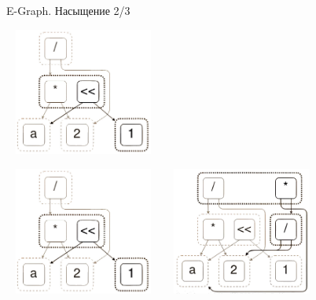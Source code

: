 \documentclass[aspectratio=169
  , xcolor={svgnames}
  , russian  %
  ]{beamer}
\begin{document}
\begin{frame}{E-Graph. Насыщение 2/3}
    {
        \begin{center}
            \includegraphics[width=5.2cm, height=4.2cm]{misc/egraphs_images/egraph_2.jpg} 
        \end{center}
    }
    {
        \begin{center}
            \includegraphics[width=5.2cm, height=4.2cm]{misc/egraphs_images/egraph_2.jpg} 
            \hspace{0.5cm} 
            \hspace{0.5cm}  
            \includegraphics[width=5.2cm, height=4.2cm]{misc/egraphs_images/egraph_3.jpg} 
        \end{center}
    }
\end{frame}
\end{document}
